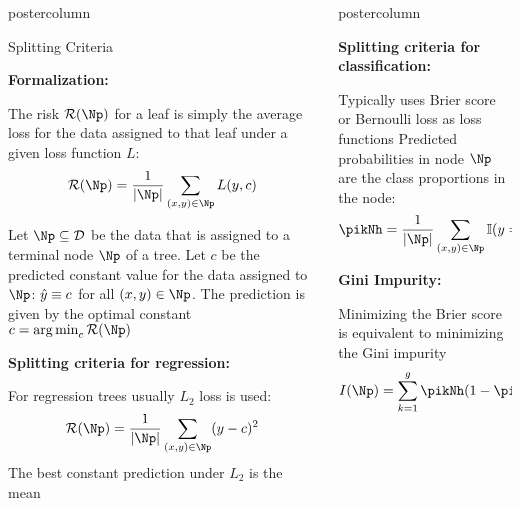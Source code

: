 \documentclass{beamer}
\begin{document}
\begin{frame}[fragile]{}
\begin{columns}
\begin{column}{.31\textwidth}
\begin{beamercolorbox}[center]{postercolumn}
\begin{minipage}{.98\textwidth}
{\begin{myblock}{Splitting Criteria}
\begin{codebox} \textbf{Formalization: }
\end{codebox}
The risk $\risk(\Np)$ for a leaf is simply the average loss for the data assigned to that leaf under a given loss function $L$: $$\risk(\Np) = \frac{1}{|\Np|} \sum\limits_{(x,y) \in \Np} L(y, c)$$
  
  Let $\Np \subseteq \D$ be the data that is assigned to a terminal node $\Np$ of a tree.
Let $c$ be the predicted constant value for the data assigned to $\Np$: $\hat{y} \equiv c$ for all $\left(x,y\right) \in \Np$.\vspace*{1ex}
The prediction is given by the optimal constant $c = \argmin_c \risk(\Np)$

\begin{codebox}
\textbf{Splitting criteria for regression: }\end{codebox}
For regression trees usually $L_2$ loss is used: 
  $$\risk(\Np) = \frac{1}{|\Np|} \sum\limits_{(x,y) \in \Np} (y - c)^2$$\vspace*{1ex}
The best constant prediction under $L_2$ is the mean

\end{myblock}\vfill
				}
			\end{minipage}
		\end{beamercolorbox}
	\end{column}
	

\begin{column}{.31\textwidth}
\begin{beamercolorbox}[center]{postercolumn}
\begin{minipage}{.98\textwidth}
\parbox[t][\columnheight]{\textwidth}{
  \begin{myblock}{ }
  \begin{codebox}
  \textbf{Splitting criteria for classification:}
  \end{codebox} Typically uses Brier score or  Bernoulli loss as loss functions
  Predicted probabilities in node $\Np$ are the class proportions in the node:
    $$ \pikNh = \frac{1}{|\Np|} \sum\limits_{(x,y) \in \Np} \I(y = k) $$
    
    \begin{codebox}
  \textbf{Gini Impurity:}
  \end{codebox}
  Minimizing the Brier score is equivalent to minimizing the Gini impurity $$I(\Np) = \sum_{k=1}^g \pikNh(1-\pikNh)$$
    

\end{myblock}}
\end{minipage}
\end{beamercolorbox}
\end{column}
\end{columns}
\end{frame}
\end{document}
